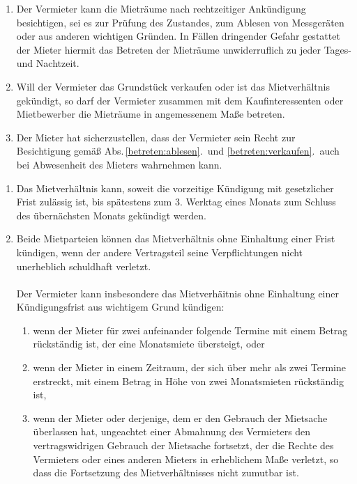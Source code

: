 \documentclass{scrreprt}[12pt,a4paper,twoside,duplex]
\begin{document}
\begin{contract}
\begin{enumerate}
  \item\label{betreten:ablesen} Der Vermieter kann die Mieträume nach rechtzeitiger Ankündigung
  besichtigen, sei es zur Prüfung des Zustandes, zum Ablesen von Messgeräten
  oder aus anderen wichtigen Gründen. In Fällen dringender Gefahr gestattet der
  Mieter hiermit das Betreten der Mieträume unwiderruflich zu jeder Tages- und
  Nachtzeit.
  \item\label{betreten:verkaufen} Will der Vermieter das Grundstück verkaufen
  oder ist das Mietverhältnis gekündigt, so darf der Vermieter zusammen mit dem
  Kaufinteressenten oder Mietbewerber die Mieträume in angemessenem Maße
  betreten.
  \item Der Mieter hat sicherzustellen, dass der Vermieter sein Recht zur
  Besichtigung gemäß Abs.\,\ref{betreten:ablesen}.\ und
  \ref{betreten:verkaufen}.\ auch bei Abwesenheit des Mieters wahrnehmen kann.
\end{enumerate}
\end{contract}

\begin{contract}
\begin{enumerate}
  \item Das Mietverhältnis kann, soweit die vorzeitige Kündigung mit
  gesetzlicher Frist zulässig ist, bis spätestens zum 3. Werktag eines Monats
  zum Schluss des ü\-ber\-nä\-chst\-en Monats gekündigt werden.
  \item Beide Mietparteien können das Mietverhältnis ohne Einhaltung einer Frist
  kündigen, wenn der andere Vertragsteil seine Verpflichtungen nicht unerheblich
  schuldhaft verletzt.\\
  \\
  Der Vermieter kann insbesondere das Mietverhäitnis ohne Einhaltung einer
  Kün\-di\-gungs\-frist aus wichtigem Grund kündigen:
  \begin{enumerate}
    \item wenn der Mieter für zwei aufeinander folgende Termine mit einem Betrag
    rückständig ist, der eine Monatsmiete übersteigt, oder
    \item wenn der Mieter in einem Zeitraum, der sich über mehr als zwei Termine
    erstreckt, mit einem Betrag in Höhe von zwei Monatsmieten rückständig ist,
    \item wenn der Mieter oder derjenige, dem er den Gebrauch der Mietsache
    überlassen hat, ungeachtet einer Abmahnung des Vermieters den
    vertragswidrigen Gebrauch der Mietsache fortsetzt, der die Rechte des
    Vermieters oder eines anderen Mieters in erheblichem Maße verletzt, so dass
    die Fortsetzung des Mietverhältnisses nicht zumutbar ist.
  \end{enumerate}
\end{enumerate}
\end{contract}
\end{document}
